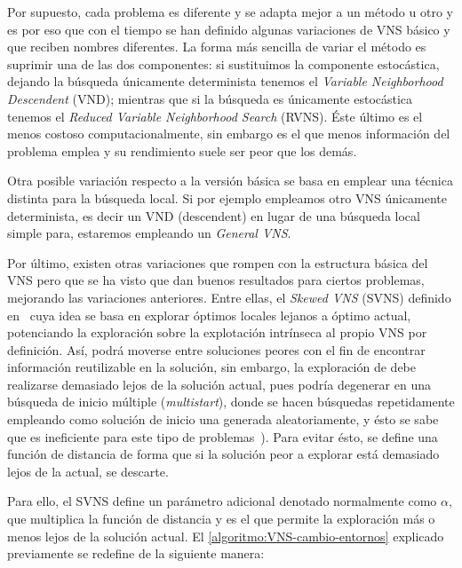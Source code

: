 Por supuesto, cada problema es diferente y se adapta mejor a un método u otro y es por eso que con el tiempo se han definido algunas variaciones de VNS básico y que reciben nombres diferentes. La forma más sencilla de variar el método es suprimir una de las dos componentes: si sustituimos la componente estocástica, dejando la búsqueda únicamente determinista tenemos el \textit{Variable Neighborhood Descendent} (VND); mientras que si la búsqueda es únicamente estocástica tenemos el \textit{Reduced Variable Neighborhood Search} (RVNS). Éste último es el menos costoso computacionalmente, sin embargo es el que menos información del problema emplea y su rendimiento suele ser peor que los demás. 

Otra posible variación respecto a la versión básica se basa en  emplear una técnica distinta para la búsqueda local. Si por ejemplo empleamos otro VNS únicamente determinista, es decir un VND (descendent) en lugar de una búsqueda local simple para, estaremos empleando un \textit{General VNS}.

Por último, existen otras variaciones que rompen con la estructura básica del VNS pero que se ha visto que dan buenos resultados para ciertos problemas,  mejorando las variaciones anteriores. Entre ellas, el \textit{Skewed VNS} (SVNS) definido en~\cite{svns-def} cuya idea se basa en explorar óptimos locales lejanos a óptimo actual, potenciando la exploración sobre la explotación intrínseca al propio VNS por definición. Así, podrá moverse entre soluciones peores con el fin de encontrar información reutilizable en la solución, sin embargo, la exploración de debe realizarse demasiado lejos de la solución actual, pues podría degenerar en una búsqueda de inicio múltiple (\textit{multistart}), donde se hacen búsquedas repetidamente empleando como solución de inicio una generada aleatoriamente, y ésto se sabe que es ineficiente para este tipo de problemas~\cite{vns}). Para evitar ésto, se define una función de distancia de forma que si la solución peor a explorar está demasiado lejos de la actual, se descarte.

Para ello, el SVNS define un parámetro adicional denotado normalmente como $\alpha$, que multiplica la función de distancia y es el que permite la exploración más o menos lejos de la solución actual. El \autoref{algoritmo:VNS-cambio-entornos} explicado previamente se redefine de la siguiente manera:


